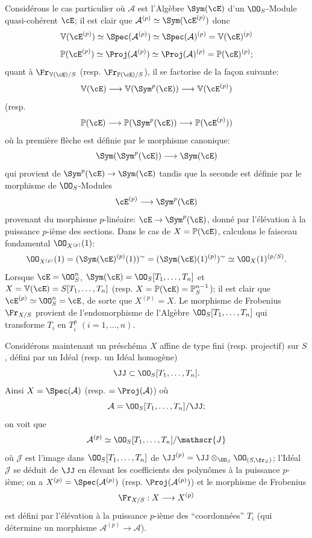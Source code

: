 Considérons le cas particulier où $\mathcal{A}$ est l'Algèbre  $\Sym(\cE)$ d'un $\OO_S$-Module quasi-cohérent $\cE$; il est clair que $\mathcal{A}^{(p)}\simeq\Sym(\cE^{(p)})$ donc
\[
\mathbb{V}(\cE^{(p)})\simeq\Spec(\mathcal{A}^{(p)})\simeq\Spec(\mathcal{A})^{(p)}=\mathbb{V}(\cE)^{(p)}
\]
\[
\mathbb{P}(\cE^{(p)})\simeq\Proj(\mathcal{A}^{(p)})\simeq\Proj(\mathcal{A})^{(p)}=\mathbb{P}(\cE)^{(p)};
\]
quant à $\Fr_{\mathbb{V}(\cE)/S}$ (resp. $\Fr_{\mathbb{P}(\cE)/S}$), il se factorise de la façon suivante:
\[
\mathbb{V}(\cE)\longrightarrow \mathbb{V}(\Sym^p(\cE))\longrightarrow \mathbb{V}(\cE^{(p)})
\]
(resp.
\[
\mathbb{P}(\cE)\longrightarrow \mathbb{P}(\Sym^p(\cE))\longrightarrow \mathbb{P}(\cE^{(p)}))
\]
où la
première flèche est définie par le morphisme canonique:
\[
\Sym(\Sym^p(\cE))\longrightarrow \Sym(\cE)
\]
qui provient de $\Sym^p(\cE)\to\Sym(\cE)$ tandis que la seconde est définie par le morphisme de $\OO_S$-Modules
\[
\cE^{(p)}\longrightarrow \Sym^p(\cE)
\]
provenant du morphisme $p$-linéaire: $\cE\to\Sym^p(\cE)$, donné par l'élévation à la puissance  $p$-ième des sections. Dans le cas de $X=\mathbb{P}(\cE)$, calculons le faisceau fondamental $\OO_{X^{(p)}}(1)$:
\[
\OO_{X^{(p)}}(1)=(\Sym(\cE)^{(p)}(1))^{\sim}
=(\Sym(\cE)(1)^{(p)})^{\sim}
\simeq \OO_X(1)^{(p/S)}.
\]
Lorsque $\cE=\OO_S^n$, $\Sym(\cE)=\OO_S[T_1,\ldots,T_n]$ et $X=\mathbb{V}(\cE)=S[T_1,\ldots,T_n]$ (resp. $X=\mathbb{P}(\cE)=\mathbb{P}_S^{n-1}$); il est clair que $\cE^{(p)}\simeq\OO_S^n=\cE$, de sorte que $X^{(p)}=X$. Le morphisme de Frobenius $\Fr_{X/S}$ provient de l'endomorphisme de l'Algèbre $\OO_S[T_1,\ldots,T_n]$ qui transforme $T_i$ en $T_i^p$ $(i=1,\ldots,n)$.

Considérons maintenant un préschéma $X$ affine de type fini (resp. projectif) sur $S$, défini par un Idéal (resp. un Idéal homogène)
\[
\JJ\subset \OO_S[T_1,\ldots,T_n].
\]
Ainsi $X=\Spec(\mathcal{A})$ (resp. $=\Proj(\mathcal{A})$) où
\[
\mathcal{A}=\OO_S[T_1,\ldots,T_n]/\JJ;
\]
on voit que
\[
\mathcal{A}^{(p)}\simeq \OO_S[T_1,\ldots,T_n]/\mathscr{J}
\]
où $\mathscr{J}$ est l'image dans $\OO_S[T_1,\ldots,T_n]$ de $\JJ^{(p)}=\JJ\otimes_{\OO_S}\OO_{(S,\fr_S)}$; l'Idéal $\mathscr{J}$ se déduit de $\JJ$ en élevant les coefficients des polynômes à la puissance $p$-ième; on a $X^{(p)}=\Spec(\mathcal{A}^{(p)})$ (resp. $\Proj(\mathcal{A}^{(p)})$) et le
morphisme de Frobenius
\[
\Fr_{X/S}:X\longrightarrow X^{(p)}
\]
est défini par l'élévation à la puissance $p$-ième des ``coordonnées'' $T_i$ (qui détermine un morphisme $\mathcal{A}^{(p)}\to\mathcal{A}$).


